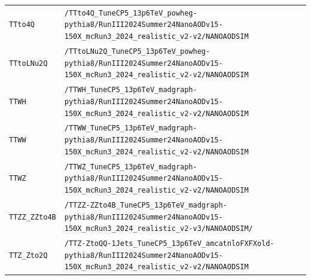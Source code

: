 \begin{longtable}{@{}>{\RaggedRight\arraybackslash}p{} >{\RaggedRight\arraybackslash}p{}@{}}
\addlinespace[2pt]
\texttt{TTto4Q} & \texttt{/\allowbreak{}TTto4Q\_\allowbreak{}TuneCP5\_\allowbreak{}13p6TeV\_\allowbreak{}powheg-\allowbreak{}pythia8/\allowbreak{}RunIII2024Summer24NanoAODv15-\allowbreak{}150X\_\allowbreak{}mcRun3\_\allowbreak{}2024\_\allowbreak{}realistic\_\allowbreak{}v2-\allowbreak{}v2/\allowbreak{}NANOAODSIM} \\
\addlinespace[2pt]
\texttt{TTtoLNu2Q} & \texttt{/\allowbreak{}TTtoLNu2Q\_\allowbreak{}TuneCP5\_\allowbreak{}13p6TeV\_\allowbreak{}powheg-\allowbreak{}pythia8/\allowbreak{}RunIII2024Summer24NanoAODv15-\allowbreak{}150X\_\allowbreak{}mcRun3\_\allowbreak{}2024\_\allowbreak{}realistic\_\allowbreak{}v2-\allowbreak{}v2/\allowbreak{}NANOAODSIM} \\
\addlinespace[2pt]
\texttt{TTWH} & \texttt{/\allowbreak{}TTWH\_\allowbreak{}TuneCP5\_\allowbreak{}13p6TeV\_\allowbreak{}madgraph-\allowbreak{}pythia8/\allowbreak{}RunIII2024Summer24NanoAODv15-\allowbreak{}150X\_\allowbreak{}mcRun3\_\allowbreak{}2024\_\allowbreak{}realistic\_\allowbreak{}v2-\allowbreak{}v2/\allowbreak{}NANOAODSIM} \\
\addlinespace[2pt]
\texttt{TTWW} & \texttt{/\allowbreak{}TTWW\_\allowbreak{}TuneCP5\_\allowbreak{}13p6TeV\_\allowbreak{}madgraph-\allowbreak{}pythia8/\allowbreak{}RunIII2024Summer24NanoAODv15-\allowbreak{}150X\_\allowbreak{}mcRun3\_\allowbreak{}2024\_\allowbreak{}realistic\_\allowbreak{}v2-\allowbreak{}v2/\allowbreak{}NANOAODSIM} \\
\addlinespace[2pt]
\texttt{TTWZ} & \texttt{/\allowbreak{}TTWZ\_\allowbreak{}TuneCP5\_\allowbreak{}13p6TeV\_\allowbreak{}madgraph-\allowbreak{}pythia8/\allowbreak{}RunIII2024Summer24NanoAODv15-\allowbreak{}150X\_\allowbreak{}mcRun3\_\allowbreak{}2024\_\allowbreak{}realistic\_\allowbreak{}v2-\allowbreak{}v2/\allowbreak{}NANOAODSIM} \\
\addlinespace[2pt]
\texttt{TTZZ\_\allowbreak{}ZZto4B} & \texttt{/\allowbreak{}TTZZ-\allowbreak{}ZZto4B\_\allowbreak{}TuneCP5\_\allowbreak{}13p6TeV\_\allowbreak{}madgraph-\allowbreak{}pythia8/\allowbreak{}RunIII2024Summer24NanoAODv15-\allowbreak{}150X\_\allowbreak{}mcRun3\_\allowbreak{}2024\_\allowbreak{}realistic\_\allowbreak{}v2-\allowbreak{}v3/\allowbreak{}NANOAODSIM/\allowbreak{}} \\
\addlinespace[2pt]
\texttt{TTZ\_\allowbreak{}Zto2Q} & \texttt{/\allowbreak{}TTZ-\allowbreak{}ZtoQQ-\allowbreak{}1Jets\_\allowbreak{}TuneCP5\_\allowbreak{}13p6TeV\_\allowbreak{}amcatnloFXFXold-\allowbreak{}pythia8/\allowbreak{}RunIII2024Summer24NanoAODv15-\allowbreak{}150X\_\allowbreak{}mcRun3\_\allowbreak{}2024\_\allowbreak{}realistic\_\allowbreak{}v2-\allowbreak{}v2/\allowbreak{}NANOAODSIM} \\

\end{longtable}
